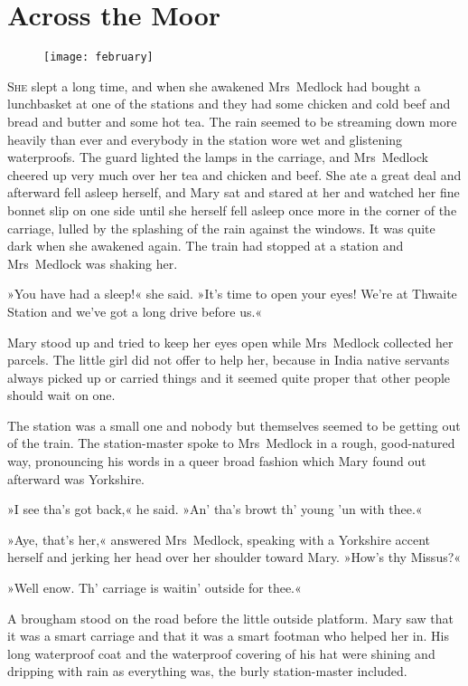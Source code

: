 \chapter{Across the Moor} 
	
\begin{figure}[t!]
\centering
\texttt{[image: february]}
\end{figure}

 \lettrine[lines=6]{S}{he} slept a long time, and when she awakened Mrs~Medlock had bought a lunchbasket at one of the stations and they had some chicken and cold beef and bread and butter and some hot tea. The rain seemed to be streaming down more heavily than ever and everybody in the station wore wet and glistening waterproofs. The guard lighted the lamps in the carriage, and Mrs~Medlock cheered up very much over her tea and chicken and beef. She ate a great deal and afterward fell asleep herself, and Mary sat and stared at her and watched her fine bonnet slip on one side until she herself fell asleep once more in the corner of the carriage, lulled by the splashing of the rain against the windows. It was quite dark when she awakened again. The train had stopped at a station and Mrs~Medlock was shaking her.

»You have had a sleep!« she said. »It's time to open your eyes! We're at Thwaite Station and we've got a long drive before us.«

Mary stood up and tried to keep her eyes open while Mrs~Medlock collected her parcels. The little girl did not offer to help her, because in India native servants always picked up or carried things and it seemed quite proper that other people should wait on one.

The station was a small one and nobody but themselves seemed to be getting out of the train. The station-master spoke to Mrs~Medlock in a rough, good-natured way, pronouncing his words in a queer broad fashion which Mary found out afterward was Yorkshire.

»I see tha's got back,« he said. »An' tha's browt th' young 'un with thee.«

»Aye, that's her,« answered Mrs~Medlock, speaking with a Yorkshire accent herself and jerking her head over her shoulder toward Mary. »How's thy Missus?«

»Well enow. Th' carriage is waitin' outside for thee.«

A brougham stood on the road before the little outside platform. Mary saw that it was a smart carriage and that it was a smart footman who helped her in. His long waterproof coat and the waterproof covering of his hat were shining and dripping with rain as everything was, the burly station-master included.

